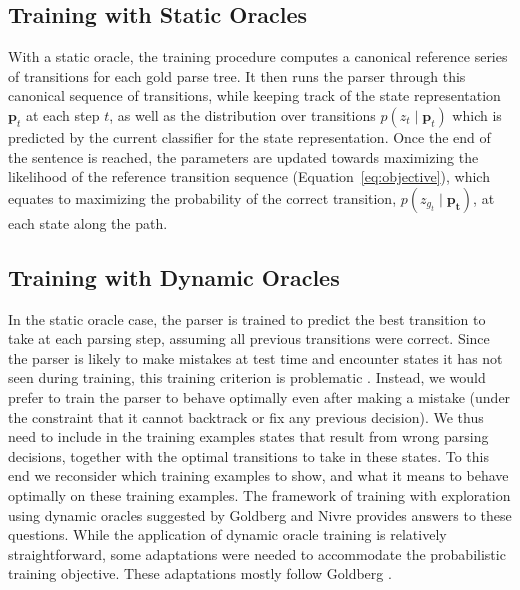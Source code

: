 \documentclass[11pt]{article}
\begin{document}
\subsection{Training with Static Oracles} \label{static-oracle}
With a static oracle, the training procedure computes a canonical
reference series of transitions for each gold parse tree. It then runs the parser through
this canonical sequence of transitions, while keeping track of the state
representation $\mathbf{p}_t$ at each step $t$, as well as the distribution over transitions $p(z_t
\mid \mathbf{p}_t)$ which is predicted by the current classifier for the state representation.
Once the end of the sentence is reached, the parameters are  updated towards
maximizing the likelihood of the reference transition sequence
(Equation~\ref{eq:objective}), which equates to maximizing the
probability of the correct transition,
$p(z_{g_t} \mid \mathbf{p_t})$, at each state along the path.

\subsection{Training with Dynamic Oracles}
\label{dyn-train}
In the static oracle case, the parser is trained to predict the best transition
to take at each parsing step,
assuming all previous transitions were correct.
Since the parser is likely to make mistakes at test time and encounter states
it has not seen during training, this training criterion is problematic \cite[\emph{inter alia}]{daume09,ross11,goldberg12dynamic,goldberg2013training}. Instead, we would prefer to train the parser to behave
optimally even after making a mistake (under the constraint that it
cannot backtrack or fix any previous decision).  We thus need to include in the
training examples states that result from wrong parsing decisions,
together with the optimal transitions to take in these states.
To this end we reconsider which training examples to show, and what it
means to behave optimally on these training examples.
The framework of training with exploration using dynamic oracles suggested by
Goldberg and Nivre  provides
answers to these questions. While the application of dynamic oracle training is
relatively straightforward, some adaptations were needed to accommodate the
probabilistic training objective.  These adaptations mostly follow
Goldberg .
\end{document}
